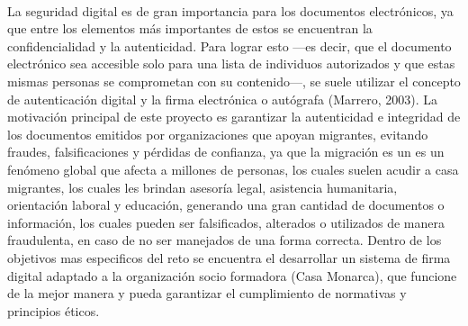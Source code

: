 \documentclass[a4paper,12pt]{article}
\begin{document}
\pagebreak

\textbf{{\selectfont {\Large Introducción:}}}\\


\begin{undefined}
{\small {\selectfont 	La seguridad digital es de gran importancia para los documentos electrónicos, ya que entre los elementos más importantes de estos se encuentran la confidencialidad y la autenticidad. Para lograr esto —es decir, que el documento electrónico sea accesible solo para una lista de individuos autorizados y que estas mismas personas se comprometan con su contenido—, se suele utilizar el concepto de autenticación digital y la firma electrónica o autógrafa (Marrero, 2003). La motivación principal de este proyecto es garantizar la autenticidad e integridad de los documentos emitidos por organizaciones que apoyan migrantes, evitando fraudes, falsificaciones y pérdidas de confianza, ya que la migración es un es un fenómeno global que afecta a millones de personas, los cuales suelen acudir a casa migrantes, los cuales les brindan asesoría legal, asistencia humanitaria, orientación laboral y educación, generando una gran cantidad de documentos o información, los cuales pueden ser falsificados, alterados o utilizados de manera fraudulenta, en caso de no ser manejados de una forma correcta. Dentro de los objetivos mas especificos del reto se encuentra el desarrollar un sistema de firma digital adaptado a la organización socio formadora (Casa Monarca), que funcione de la mejor manera y pueda garantizar el cumplimiento de normativas y principios éticos.}}
\end{undefined}

\pagebreak


\textbf{{\selectfont {\Large Marco referencial:}}}\\
\end{document}
